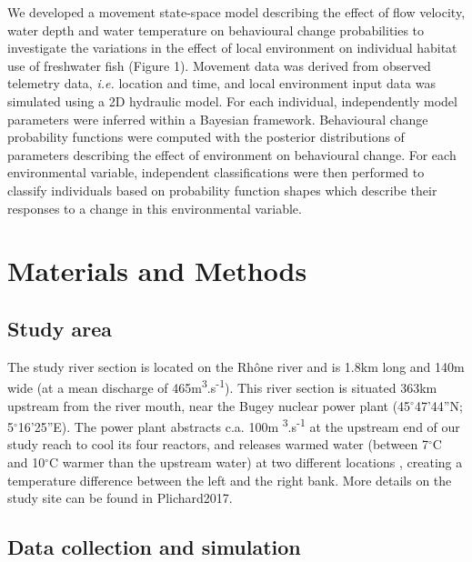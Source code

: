 \documentclass{article}
\begin{document}
\begin{linenumbers}
We developed a movement state-space model describing the effect of flow velocity, water depth and water temperature on behavioural change probabilities to investigate the variations in the effect of local environment on individual habitat use of freshwater fish (Figure 1). Movement data was derived from observed telemetry data, \textit{i.e.} location and time, and local environment input data was simulated using a 2D hydraulic model. For each individual, independently model parameters were inferred within a Bayesian framework. Behavioural change probability functions were computed with the posterior distributions of parameters describing the effect of environment on behavioural change. For each environmental variable, independent classifications were then performed to classify individuals based on probability function shapes which describe their responses to a change in this environmental variable.\\



\section{Materials and Methods}



\subsection{Study area}

The study river section is located on the Rh\^one river and is 1.8km long and 140m wide (at a mean discharge of 465m\textsuperscript{3}.s\textsuperscript{-1}). This river section is situated 363km upstream from the river mouth, near the Bugey nuclear 
power plant (45$^{\circ}$47'44''N; 5$^{\circ}$16'25''E). The power plant abstracts c.a. 100m \textsuperscript{3}.s\textsuperscript{-1}
at the upstream end of our study reach to cool its four reactors, and releases warmed water (between 7$^{\circ}$C and
10$^{\circ}$C warmer than the upstream water) at two different locations %
, creating a temperature difference between the left and the right bank. More details on the study site can be found in Plichard2017.



\subsection{Data collection and simulation}



\end{linenumbers}
\end{document}
